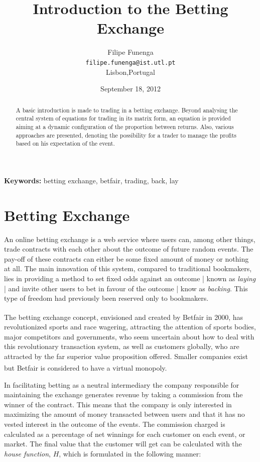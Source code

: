 \documentclass{article}
\begin{document}
\title{Introduction to the Betting Exchange}
\author{Filipe Funenga\\
\texttt{filipe.funenga@ist.utl.pt}\\
Lisbon,Portugal}
\date{September 18, 2012}
\maketitle
\begin{center} {\small \bf Keywords:} betting exchange, betfair,
                                        trading, back, lay \end{center}
\begin{abstract}
A basic introduction is made to trading in a betting exchange. 
Beyond analysing the central system of equations for trading in its 
matrix form, an equation is provided aiming at a dynamic 
configuration of the proportion between returns. Also, various 
approaches are presented, denoting the possibility for a trader to 
manage the profits based on his expectation of the event.
\end{abstract}
\tableofcontents
\section{Betting Exchange}
An online betting exchange is a web service where users can, among 
other things, trade contracts with each other about the outcome of 
future random events. The pay-off of these contracts can either be 
some fixed amount of money or nothing at all. The main innovation of 
this system, compared to traditional bookmakers, lies in providing a 
method to set fixed odds against an outcome | known as \emph{laying} 
| and invite other users to bet in favour of the outcome | know as 
\emph{backing}. This type of freedom had previously been reserved 
only to bookmakers.

The betting exchange concept, envisioned and created by 
Betfair\textsuperscript{\textregistered} in 2000, has revolutionized 
sports and race wagering, attracting the attention of sports bodies, 
major competitors and governments, who seem uncertain about how to 
deal with this revolutionary transaction system, as well as 
customers globally, who are attracted by the far superior value 
proposition offered. \cite{DaviesPittShapiroWatson2005} Smaller 
companies exist but Betfair\textsuperscript{\textregistered} is 
considered to have a virtual monopoly.

In facilitating betting as a neutral intermediary the company 
responsible for maintaining the exchange generates revenue by taking 
a commission from the winner of the contract. This means that the 
company is only interested in maximizing the amount of money 
transacted between users and that it has no vested interest in the 
outcome of the events. The commission charged is calculated as a 
percentage of net winnings for each customer on each event, or 
market. The final value that the customer will get can be calculated 
with the \emph{house function}, $H$, which is formulated in the 
following manner:
\end{document}
